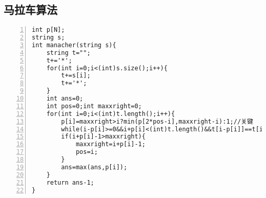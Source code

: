 \subsection{马拉车算法}
\begin{lstlisting}[language={[ANSI]C},numbers=left]
int p[N];
string s;
int manacher(string s){
	string t="";
	t+='*';
	for(int i=0;i<(int)s.size();i++){
		t+=s[i];
		t+='*';
	}
	int ans=0;
	int pos=0;int maxxright=0;
	for(int i=0;i<(int)t.length();i++){
		p[i]=maxxright>i?min(p[2*pos-i],maxxright-i):1;//关键
		while(i-p[i]>=0&&i+p[i]<(int)t.length()&&t[i-p[i]]==t[i+p[i]]) p[i]++;
		if(i+p[i]-1>maxxright){
			maxxright=i+p[i]-1;
			pos=i;
		}
		ans=max(ans,p[i]);
	}
	return ans-1;
}
\end{lstlisting}


